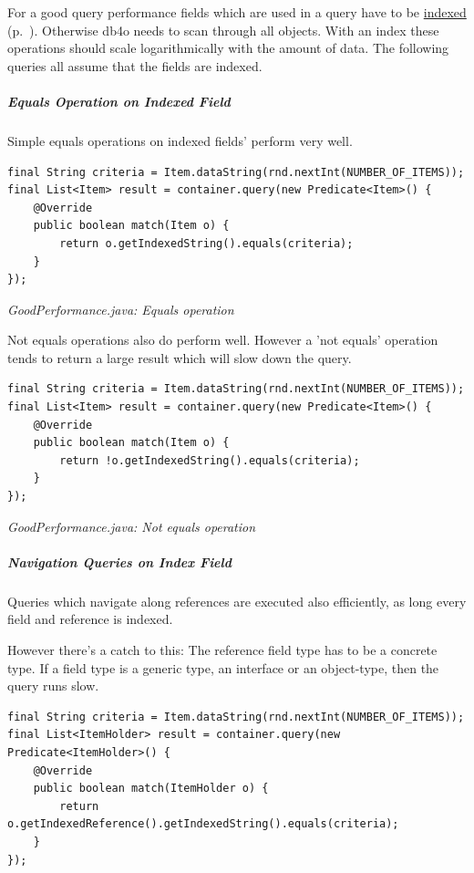 For a good query performance fields which are used in a query have to be \hyperref[ref:basics-indexing]{indexed} (p.~\pageref{ref:basics-indexing}). Otherwise db4o needs to scan through all objects. With an index these operations should scale logarithmically with the amount of data. The following queries all assume that the fields are indexed.

\subparagraph*{Equals Operation on Indexed Field}

Simple equals operations on indexed fields' perform very well.

\begin{lstlisting}
final String criteria = Item.dataString(rnd.nextInt(NUMBER_OF_ITEMS));
final List<Item> result = container.query(new Predicate<Item>() {
    @Override
    public boolean match(Item o) {
        return o.getIndexedString().equals(criteria);
    }
});
\end{lstlisting}

{\small\itshape GoodPerformance.java: Equals operation\par}
\medskip

Not equals operations also do perform well. However a 'not equals' operation tends to return a large result which will slow down the query.

\begin{lstlisting}
final String criteria = Item.dataString(rnd.nextInt(NUMBER_OF_ITEMS));
final List<Item> result = container.query(new Predicate<Item>() {
    @Override
    public boolean match(Item o) {
        return !o.getIndexedString().equals(criteria);
    }
});
\end{lstlisting}

{\small\itshape GoodPerformance.java: Not equals operation\par}
\medskip

\subparagraph*{Navigation Queries on Index Field}

Queries which navigate along references are executed also efficiently, as long every field and reference is indexed.

However there's a catch to this: The reference field type has to be a concrete type. If a field type is a generic type, an interface or an object-type, then the query runs slow.

\begin{lstlisting}
final String criteria = Item.dataString(rnd.nextInt(NUMBER_OF_ITEMS));
final List<ItemHolder> result = container.query(new Predicate<ItemHolder>() {
    @Override
    public boolean match(ItemHolder o) {
        return o.getIndexedReference().getIndexedString().equals(criteria);
    }
});
\end{lstlisting}

